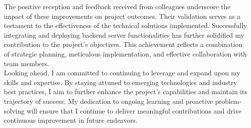 \noindent The positive reception and feedback received from colleagues underscore the impact of these improvements on project outcomes. Their validation serves as a testament to the effectiveness of the technical solutions implemented. Successfully integrating and deploying backend server functionalities has further solidified my contribution to the project's objectives. This achievement reflects a combination of strategic planning, meticulous implementation, and effective collaboration with team members. \\

\noindent Looking ahead, I am committed to continuing to leverage and expand upon my skills and expertise. By staying attuned to emerging technologies and industry best practices, I aim to further enhance the project's capabilities and maintain its trajectory of success. My dedication to ongoing learning and proactive problem-solving will ensure that I continue to deliver meaningful contributions and drive continuous improvement in future endeavors.

